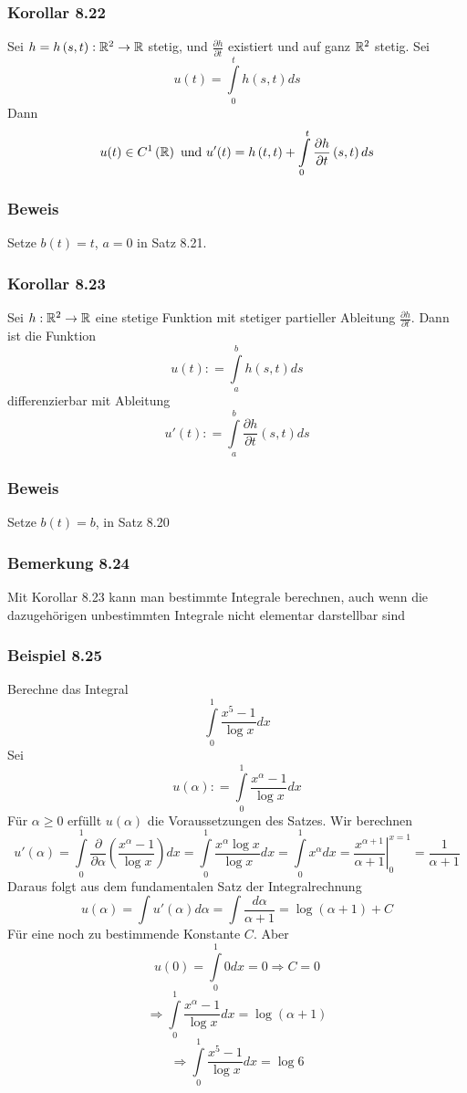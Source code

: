 \subsubsection*{Korollar 8.22}
Sei $h=h\left( s,t\right) :\mathbb{R}^2\to\mathbb{R}$ stetig, und $\frac{\partial h}{\partial t}$ existiert und auf ganz $\mathbb{R}^2$ stetig. Sei \[u(t) = \int\limits_0^t {h\left( {s,t} \right)ds} \] Dann \[u(t) \in C^1\left( \mathbb{R}\right)\text{ und }u'(t) = h\left( {t,t} \right) + \int\limits_0^t {\frac{{\partial h}}{{\partial t}}\left( {s,t} \right)ds} \]

\subsubsection*{Beweis}
Setze $b(t)=t$, $a=0$ in Satz 8.21.

\subsubsection*{Korollar 8.23}
Sei $h:\mathbb{R}^2\to\mathbb{R}$ eine stetige Funktion mit stetiger partieller Ableitung $\frac{\partial h}{\partial t}$. Dann ist die Funktion \[u(t): = \int\limits_a^b {h(s,t)ds} \] differenzierbar mit Ableitung \[u'(t): = \int\limits_a^b {\frac{{\partial h}}{{\partial t}}(s,t)ds} \]

\subsubsection*{Beweis}
Setze $b(t)=b$, in Satz 8.20

\subsubsection*{Bemerkung 8.24}
Mit Korollar 8.23 kann man bestimmte Integrale berechnen, auch wenn die dazugehörigen unbestimmten Integrale nicht elementar darstellbar sind
\subsubsection*{Beispiel 8.25}
Berechne das Integral \[\int\limits_0^1 {\frac{{{x^5} - 1}}{{\log x}}} dx\] Sei \[u\left( \alpha  \right): = \int\limits_0^1 {\frac{{{x^\alpha } - 1}}{{\log x}}dx} \] Für $\alpha \geq 0$ erfüllt $u\left(\alpha\right)$ die Voraussetzungen des Satzes. Wir berechnen \[u'\left( \alpha  \right) = \int\limits_0^1 {\frac{\partial }{{\partial \alpha }}\left( {\frac{{{x^\alpha } - 1}}{{\log x}}} \right)dx}  = \int\limits_0^1 {\frac{{{x^\alpha }\log x}}{{\log x}}dx = \int\limits_0^1 {{x^\alpha }dx}  = \left. {\frac{{{x^{\alpha  + 1}}}}{{\alpha  + 1}}} \right|_0^{x = 1} = } \frac{1}{{\alpha  + 1}}\]
Daraus folgt aus dem fundamentalen Satz der Integralrechnung \[u\left( \alpha  \right) = \int {u'\left( \alpha  \right)d\alpha  = \int {\frac{{d\alpha }}{{\alpha  + 1}} = \log \left( {\alpha  + 1} \right)} }  + C\]
Für eine noch zu bestimmende Konstante $C$. Aber
\[u\left( 0 \right) = \int\limits_0^1 {0dx = 0 \Rightarrow C = 0} \]
\[ \Rightarrow \int\limits_0^1 {\frac{{{x^\alpha } - 1}}{{\log x}}dx = \log \left( {\alpha  + 1} \right)} \]
\[ \Rightarrow \int\limits_0^1 {\frac{{{x^5} - 1}}{{\log x}}dx = \log 6} \]

